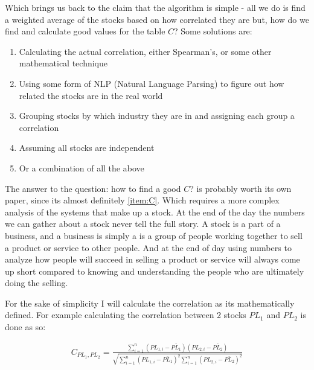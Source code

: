 \documentclass[12pt]{article}
\begin{document}
    Which brings us back to the claim that the algorithm is simple - all we do is find a
    weighted average of the stocks based on how correlated they are but, how do we find 
    and calculate good values for the table \(C\)? Some solutions are:

    \begin{enumerate}
        \item{Calculating the actual correlation, either Spearman's, or some other mathematical technique}
        \item{Using some form of NLP (Natural Language Parsing) to figure out how related the stocks are in the real world}
        \item{Grouping stocks by which industry they are in and assigning each group a correlation}
        \item{Assuming all stocks are independent}
        \item{Or a combination of all the above}\label{item:C}
    \end{enumerate}

    The answer to the question: how to find a good \(C\)? is probably worth its own paper, since
    its almost definitely \ref{item:C}. Which requires a more complex analysis of the systems
    that make up a stock. At the end of the day the numbers we can gather about a stock never
    tell the full story. A stock is a part of a business, and a business is simply a is a
    group of people working together to sell a product or service to other people.
    And at the end of day using numbers to analyze how people will succeed in selling
    a product or service will always come up short compared to knowing and understanding
    the people who are ultimately doing the selling.

    For the sake of simplicity I will calculate the correlation as its mathematically defined.
    For example calculating the correlation between 2 stocks \(PL_1\) and \(PL_2\) is
    done as so:

    \begin{align}
        C_{PL_1, PL_2} = 
        \frac{
            \displaystyle\sum^{n}_{i=1} (PL_{1, i} - \bar {PL_1})(PL_{2, i} - \bar {PL_2})
        }{
            \sqrt{
                \displaystyle\sum^{n}_{i=1}(PL_{1,i} - \bar {PL_1})^2 
                \displaystyle\sum^{n}_{i=1}(PL_{2,i} - \bar {PL_2})^2
            }
        }
        \label{eq:Correlation}
    \end{align}

\end{document}
